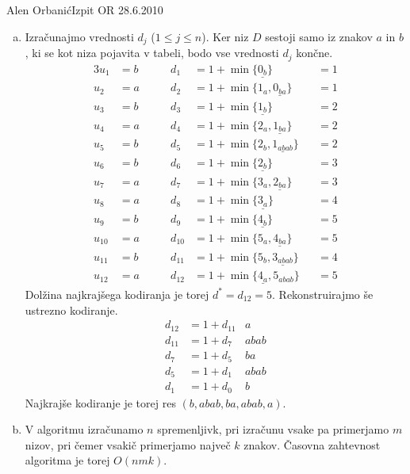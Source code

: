 \begin{naloga}{Alen Orbanić}{Izpit OR 28.6.2010}
\begin{odgovor}
\begin{enumerate}[(a)]
\item Izračunajmo vrednosti $d_j$ ($1 \le j \le n$).
Ker niz $D$ sestoji samo iz znakov $a$ in $b$,
ki se kot niza pojavita v tabeli,
bodo vse vrednosti $d_j$ končne.
\begin{alignat*}{3}
u_1    &= b &\qquad d_1    &= 1 + \min\{\underline{0_b}\} &&= 1 \\
u_2    &= a &\qquad d_2    &= 1 + \min\{1_a, \underline{0_{ba}}\} &&= 1 \\
u_3    &= b &\qquad d_3    &= 1 + \min\{\underline{1_b}\} &&= 2 \\
u_4    &= a &\qquad d_4    &= 1 + \min\{2_a, \underline{1_{ba}}\} &&= 2 \\
u_5    &= b &\qquad d_5    &= 1 + \min\{2_b, \underline{1_{abab}}\} &&= 2 \\
u_6    &= b &\qquad d_6    &= 1 + \min\{\underline{2_b}\} &&= 3 \\
u_7    &= a &\qquad d_7    &= 1 + \min\{3_a, \underline{2_{ba}}\} &&= 3 \\
u_8    &= a &\qquad d_8    &= 1 + \min\{\underline{3_a}\} &&= 4 \\
u_9    &= b &\qquad d_9    &= 1 + \min\{\underline{4_b}\} &&= 5 \\
u_{10} &= a &\qquad d_{10} &= 1 + \min\{5_a, \underline{4_{ba}}\} &&= 5 \\
u_{11} &= b &\qquad d_{11} &= 1 + \min\{5_b, \underline{3_{abab}}\} &&= 4 \\
u_{12} &= a &\qquad d_{12} &= 1 + \min\{\underline{4_a}, 5_{abab}\} &&= 5
\end{alignat*}
Dolžina najkrajšega kodiranja je torej $d^* = d_{12} = 5$.
Rekonstruirajmo še ustrezno kodiranje.
\begin{align*}
d_{12} &= 1 + d_{11} & a \\
d_{11} &= 1 + d_7    & abab \\
d_7    &= 1 + d_5    & ba \\
d_5    &= 1 + d_1    & abab \\
d_1    &= 1 + d_0    & b
\end{align*}
Najkrajše kodiranje je torej res $(b, abab, ba, abab, a)$.

\item V algoritmu izračunamo $n$ spremenljivk,
pri izračunu vsake pa primerjamo $m$ nizov,
pri čemer vsakič primerjamo največ $k$ znakov.
Časovna zahtevnost algoritma je torej $O(nmk)$.
\end{enumerate}
\end{odgovor}
\end{naloga}
